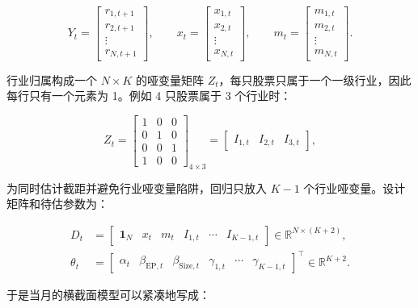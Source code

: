 \documentclass[UTF8,a4paper,11pt]{ctexart}
\begin{document}
\begin{equation}
Y_t = \begin{bmatrix} r_{1,t+1} \\ r_{2,t+1} \\ \vdots \\ r_{N,t+1} \end{bmatrix},
\qquad
x_t = \begin{bmatrix} x_{1,t} \\ x_{2,t} \\ \vdots \\ x_{N,t} \end{bmatrix},
\qquad
m_t = \begin{bmatrix} m_{1,t} \\ m_{2,t} \\ \vdots \\ m_{N,t} \end{bmatrix}.
\end{equation}

行业归属构成一个 $N \times K$ 的哑变量矩阵 $Z_t$，每只股票只属于一个一级行业，因此每行只有一个元素为 1。例如 4 只股票属于 3 个行业时：

\begin{equation}
Z_t =
\begin{bmatrix}
1 & 0 & 0 \\
0 & 1 & 0 \\
0 & 0 & 1 \\
1 & 0 & 0
\end{bmatrix}_{4 \times 3}
= \begin{bmatrix} I_{1,t} & I_{2,t} & I_{3,t} \end{bmatrix},
\end{equation}

为同时估计截距并避免行业哑变量陷阱，回归只放入 $K-1$ 个行业哑变量。设计矩阵和待估参数为：

\begin{align}
D_t &= \begin{bmatrix} \mathbf{1}_N & x_t & m_t & I_{1,t} & \cdots & I_{K-1,t} \end{bmatrix}
\in \mathbb{R}^{N \times (K+2)}, \\
\theta_t &= \begin{bmatrix} \alpha_t & \beta_{\mathrm{EP},t} & \beta_{\mathrm{Size},t} & \gamma_{1,t} & \cdots & \gamma_{K-1,t} \end{bmatrix}^{\top}
\in \mathbb{R}^{K+2}.
\end{align}

于是当月的横截面模型可以紧凑地写成：
\end{document}
